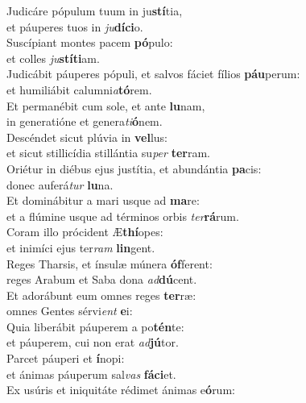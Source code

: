 \evenverse Judicáre pópulum tuum in ju\textbf{stí}tia,~\*\\
\evenverse et páuperes tuos in \textit{ju}\textbf{dí}\textbf{ci}o.\\
\oddverse Suscípiant montes pacem \textbf{pó}pulo:~\*\\
\oddverse et colles \textit{ju}\textbf{stí}\textbf{ti}am.\\
\evenverse Judicábit páuperes pópuli, et salvos fáciet fílios \textbf{páu}perum:~\*\\
\evenverse et humiliábit calumni\textit{a}\textbf{tó}rem.\\
\oddverse Et permanébit cum sole, et ante \textbf{lu}nam,~\*\\
\oddverse in generatióne et genera\textit{ti}\textbf{ó}nem.\\
\evenverse Descéndet sicut plúvia in \textbf{vel}lus:~\*\\
\evenverse et sicut stillicídia stillántia su\textit{per} \textbf{ter}ram.\\
\oddverse Oriétur in diébus ejus justítia, et abundántia \textbf{pa}cis:~\*\\
\oddverse donec auferá\textit{tur} \textbf{lu}na.\\
\evenverse Et dominábitur a mari usque ad \textbf{ma}re:~\*\\
\evenverse et a flúmine usque ad términos orbis \textit{ter}\textbf{rá}rum.\\
\oddverse Coram illo prócident Æ\textbf{thí}opes:~\*\\
\oddverse et inimíci ejus ter\textit{ram} \textbf{lin}gent.\\
\evenverse Reges Tharsis, et ínsulæ múnera \textbf{óf}ferent:~\*\\
\evenverse reges Arabum et Saba dona \textit{ad}\textbf{dú}cent.\\
\oddverse Et adorábunt eum omnes reges \textbf{ter}ræ:~\*\\
\oddverse omnes Gentes sérvi\textit{ent} \textbf{e}i:\\
\evenverse Quia liberábit páuperem a po\textbf{tén}te:~\*\\
\evenverse et páuperem, cui non erat \textit{ad}\textbf{jú}tor.\\
\oddverse Parcet páuperi et \textbf{í}nopi:~\*\\
\oddverse et ánimas páuperum sal\textit{vas} \textbf{fá}\textbf{ci}et.\\
\evenverse Ex usúris et iniquitáte rédimet ánimas e\textbf{ó}rum:~\*\\
